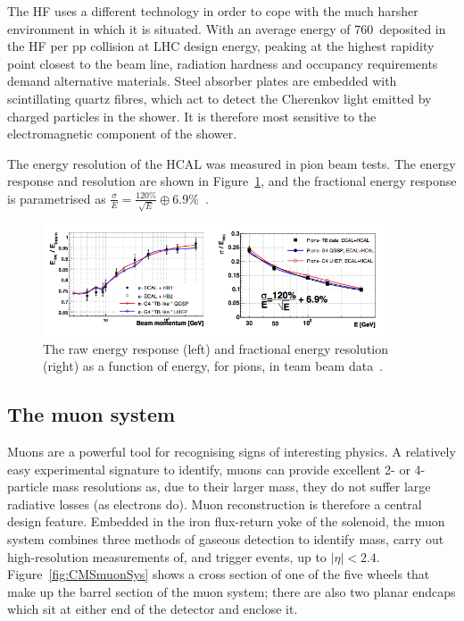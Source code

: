 The \ac{HF} uses a different technology in order to cope with the much harsher environment in which it is situated.
With an average energy of 760~\GeV deposited in the \ac{HF} per pp collision at LHC design energy, peaking at the highest rapidity point closest to the beam line, radiation hardness and occupancy requirements demand alternative materials.
Steel absorber plates are embedded with scintillating quartz fibres, which act to detect the Cherenkov light emitted by charged particles in the shower. 
It is therefore most sensitive to the electromagnetic component of the shower.

The energy resolution of the \ac{HCAL} was measured in pion beam tests. The energy response and 
resolution are shown in Figure~\ref{fig:CMShcalRes}, and the fractional energy response is parametrised
as 
$\frac{\sigma}{E} = \frac{120\%}{\sqrt{E}} \oplus 6.9\%$~\cite{TDRVOL1}.

\begin{figure}[htbp]
  \begin{center}
  \includegraphics[width=0.9\textwidth]{Figures/detector/HCALres}
  \caption{The raw energy response (left) and fractional energy resolution (right) as a function of energy, for pions, in team beam data~\cite{TDRVOL1}.
}
  \label{fig:CMShcalRes}
  \end{center}
\end{figure}


\subsection{The muon system}
Muons are a powerful tool for recognising signs of interesting physics. 
A relatively easy experimental signature to identify, muons can provide excellent 2- or 4-particle mass resolutions 
as, due to their larger mass, they do not suffer large radiative losses (as electrons do).
Muon reconstruction is therefore a central design feature. 
Embedded in the iron flux-return yoke of the solenoid, the muon system combines three methods of gaseous detection to 
identify mass, carry out high-resolution measurements of, and trigger events, up to $|\eta|<2.4$. 
Figure~\ref{fig:CMSmuonSys} shows a cross section of one of the five wheels that make up the barrel section of the muon system; there are also two planar endcaps which sit at either end of the detector and enclose it.

